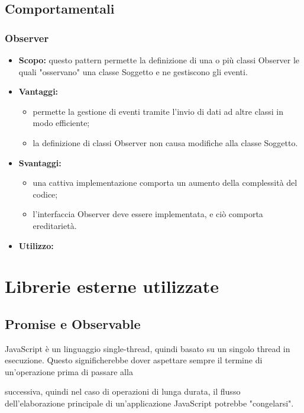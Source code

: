   \subsection{Comportamentali}
  
    \subsubsection{Observer}
      \begin{itemize}
       \item \textbf{Scopo:} questo pattern permette la definizione di una o più classi Observer le quali "osservano" una classe Soggetto e ne gestiscono gli eventi.
	\item \textbf{Vantaggi:}
	  \begin{itemize}
	   \item permette la gestione di eventi tramite l'invio di dati ad altre classi in modo efficiente;
	   \item la definizione di classi Observer non causa modifiche alla classe Soggetto. 
	  \end{itemize}
	\item \textbf{Svantaggi:}
	  \begin{itemize}
	   \item una cattiva implementazione comporta un aumento della complessità del codice;
	   \item l'interfaccia Observer deve essere implementata, e ciò comporta ereditarietà.
	  \end{itemize}
	\item \textbf{Utilizzo:}
	\end{itemize}
	
	\section{Librerie esterne utilizzate}
	\subsection{Promise e Observable}


JavaScript è un linguaggio single-thread, quindi basato su un singolo thread in esecuzione. Questo significherebbe dover aspettare sempre il termine di un'operazione prima di passare alla

successiva, quindi nel caso di operazioni di lunga durata, il flusso dell'elaborazione principale di un’applicazione JavaScript potrebbe "congelarsi". \\


